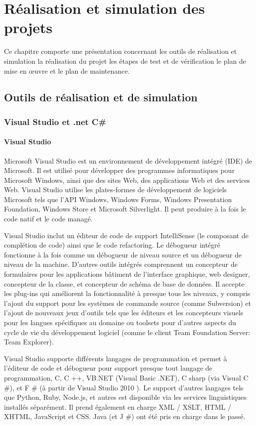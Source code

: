 \documentclass[11pt, a4paper, twoside]{book}
\begin{document}
\chapter{Réalisation et simulation des projets}
Ce chapitre comporte une présentation concernant 
les outils de réalisation et simulation 
la réalisation du projet
les étapes de test et de vérification 
le plan de mise en œuvre et le plan de maintenance.
\section{Outils	de	réalisation	et de	simulation}
\subsection{Visual Studio et .net C\#}
\subsubsection{Visual Studio}
Microsoft Visual Studio est un environnement de développement intégré (IDE) de Microsoft. Il est utilisé pour développer des programmes informatiques pour Microsoft Windows, ainsi que des sites Web, des applications Web et des services Web. Visual Studio utilise les plates-formes de développement de logiciels Microsoft tels que l'API Windows, Windows Forms, Windows Presentation Foundation, Windows Store et Microsoft Silverlight. Il peut produire à la fois le code natif et le code managé.

Visual Studio inclut un éditeur de code de support IntelliSense (le composant de complétion de code) ainsi que le code refactoring. Le débogueur intégré fonctionne à la fois comme un débogueur de niveau source et un débogueur de niveau de la machine. D'autres outils intégrés comprennent un concepteur de formulaires pour les applications bâtiment de l'interface graphique, web designer, concepteur de la classe, et concepteur de schéma de base de données. Il accepte les plug-ins qui améliorent la fonctionnalité à presque tous les niveaux, y compris l'ajout du support pour les systèmes de commande source (comme Subversion) et l'ajout de nouveaux jeux d'outils tels que les éditeurs et les concepteurs visuels pour les langues spécifiques au domaine ou toolsets pour d'autres aspects du cycle de vie du développement logiciel (comme le client Team Foundation Server: Team Explorer).

Visual Studio supporte différents langages de programmation et permet à l'éditeur de code et débogueur pour support  presque tout langage de programmation, C, C ++, VB.NET (Visual Basic .NET), C sharp (via Visual C \#), et F \# (à partir de Visual Studio 2010  ). Le support d'autres langages tels que Python, Ruby, Node.js, et autres est disponible via les services linguistiques installés séparément. Il prend également en charge XML / XSLT, HTML / XHTML, JavaScript et CSS. Java (et J \#) ont été pris en charge dans le passé.
\end{document}
